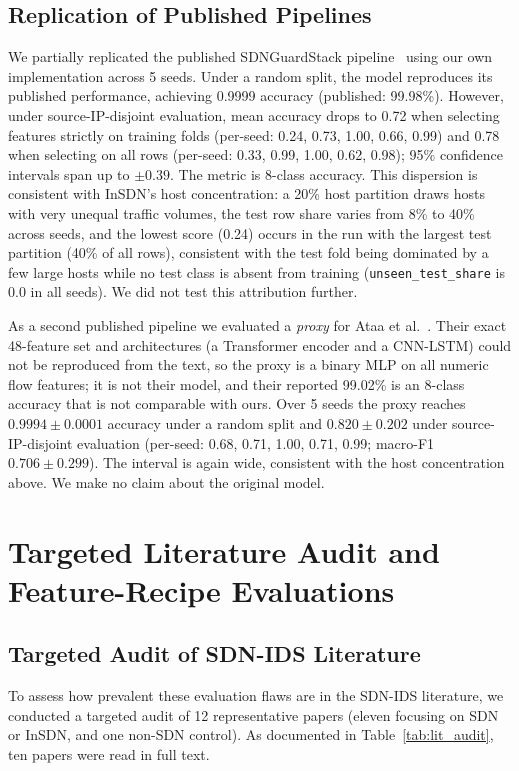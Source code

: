 \documentclass[journal]{IEEEtran}
\begin{document}
\subsection{Replication of Published Pipelines}
We partially replicated the published SDNGuardStack pipeline~\cite{ashikuzzaman2026sdnguardstack} using our own implementation across 5 seeds. Under a random split, the model reproduces its published performance, achieving 0.9999 accuracy (published: 99.98\%). However, under source-IP-disjoint evaluation, mean accuracy drops to 0.72 when selecting features strictly on training folds (per-seed: 0.24, 0.73, 1.00, 0.66, 0.99) and 0.78 when selecting on all rows (per-seed: 0.33, 0.99, 1.00, 0.62, 0.98); 95\% confidence intervals span up to $\pm 0.39$. The metric is 8-class accuracy. This dispersion is consistent with InSDN's host concentration: a 20\% host partition draws hosts with very unequal traffic volumes, the test row share varies from 8\% to 40\% across seeds, and the lowest score (0.24) occurs in the run with the largest test partition (40\% of all rows), consistent with the test fold being dominated by a few large hosts while no test class is absent from training (\texttt{unseen\_test\_share} is 0.0 in all seeds). We did not test this attribution further.

As a second published pipeline we evaluated a \emph{proxy} for Ataa et al.~\cite{ataa2024intrusion}. Their exact 48-feature set and architectures (a Transformer encoder and a CNN-LSTM) could not be reproduced from the text, so the proxy is a binary MLP on all numeric flow features; it is not their model, and their reported 99.02\% is an 8-class accuracy that is not comparable with ours. Over 5 seeds the proxy reaches $0.9994\pm0.0001$ accuracy under a random split and $0.820\pm0.202$ under source-IP-disjoint evaluation (per-seed: 0.68, 0.71, 1.00, 0.71, 0.99; macro-F1 $0.706\pm0.299$). The interval is again wide, consistent with the host concentration above. We make no claim about the original model.



\section{Targeted Literature Audit and Feature-Recipe Evaluations}\label{sec:lit_audit}
\subsection{Targeted Audit of SDN-IDS Literature}
To assess how prevalent these evaluation flaws are in the SDN-IDS literature, we conducted a targeted audit of 12 representative papers (eleven focusing on SDN or InSDN, and one non-SDN control). As documented in Table~\ref{tab:lit_audit}, ten papers were read in full text.
\end{document}
